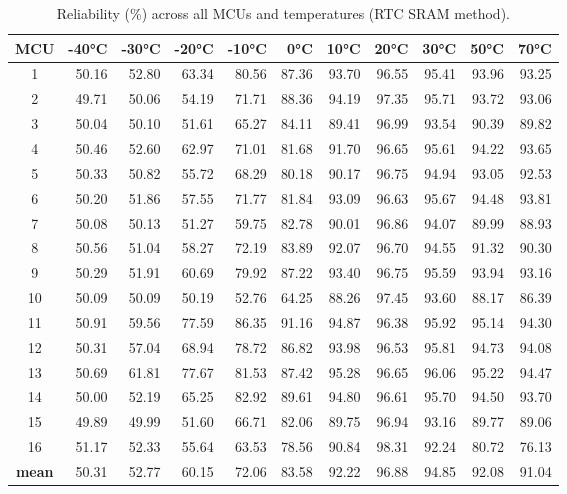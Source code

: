 \begin{table}[ht!]
    \centering
    \begin{tabular}{c||rrrrrrrrrr}
    \toprule
    \textbf{MCU} & \textbf{-40°C} & \textbf{-30°C} & \textbf{-20°C} & \textbf{-10°C} & \textbf{0°C} & \textbf{10°C} & \textbf{20°C} & \textbf{30°C} & \textbf{50°C} & \textbf{70°C} \\
    \midrule
    1    &  50.16 &  52.80 &  63.34 &  80.56 & 87.36 & 93.70 & 96.55 & 95.41 & 93.96 & 93.25 \\
    2    &  49.71 &  50.06 &  54.19 &  71.71 & 88.36 & 94.19 & 97.35 & 95.71 & 93.72 & 93.06 \\
    3    &  50.04 &  50.10 &  51.61 &  65.27 & 84.11 & 89.41 & 96.99 & 93.54 & 90.39 & 89.82 \\
    4    &  50.46 &  52.60 &  62.97 &  71.01 & 81.68 & 91.70 & 96.65 & 95.61 & 94.22 & 93.65 \\
    5    &  50.33 &  50.82 &  55.72 &  68.29 & 80.18 & 90.17 & 96.75 & 94.94 & 93.05 & 92.53 \\
    6    &  50.20 &  51.86 &  57.55 &  71.77 & 81.84 & 93.09 & 96.63 & 95.67 & 94.48 & 93.81 \\
    7    &  50.08 &  50.13 &  51.27 &  59.75 & 82.78 & 90.01 & 96.86 & 94.07 & 89.99 & 88.93 \\
    8    &  50.56 &  51.04 &  58.27 &  72.19 & 83.89 & 92.07 & 96.70 & 94.55 & 91.32 & 90.30 \\
    9    &  50.29 &  51.91 &  60.69 &  79.92 & 87.22 & 93.40 & 96.75 & 95.59 & 93.94 & 93.16 \\
    10   &  50.09 &  50.09 &  50.19 &  52.76 & 64.25 & 88.26 & 97.45 & 93.60 & 88.17 & 86.39 \\
    11   &  50.91 &  59.56 &  77.59 &  86.35 & 91.16 & 94.87 & 96.38 & 95.92 & 95.14 & 94.30 \\
    12   &  50.31 &  57.04 &  68.94 &  78.72 & 86.82 & 93.98 & 96.53 & 95.81 & 94.73 & 94.08 \\
    13   &  50.69 &  61.81 &  77.67 &  81.53 & 87.42 & 95.28 & 96.65 & 96.06 & 95.22 & 94.47 \\
    14   &  50.00 &  52.19 &  65.25 &  82.92 & 89.61 & 94.80 & 96.61 & 95.70 & 94.50 & 93.70 \\
    15   &  49.89 &  49.99 &  51.60 &  66.71 & 82.06 & 89.75 & 96.94 & 93.16 & 89.77 & 89.06 \\
    16   &  51.17 &  52.33 &  55.64 &  63.53 & 78.56 & 90.84 & 98.31 & 92.24 & 80.72 & 76.13 \\
    \textbf{mean} &  50.31 &  52.77 &  60.15 &  72.06 & 83.58 & 92.22 & 96.88 & 94.85 & 92.08 & 91.04 \\
    \bottomrule
    \end{tabular}
    \captionsetup{justification=centering,margin=0.5cm}
    \caption{Reliability (\%) across all MCUs and temperatures (RTC SRAM method).}
    \label{table:reliability_rtc_sram}
\end{table}

